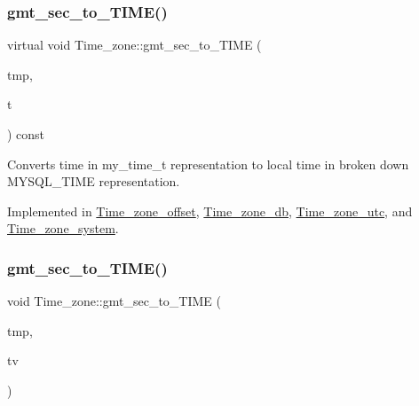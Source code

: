 \subsubsection{\texorpdfstring{gmt\+\_\+sec\+\_\+to\+\_\+\+T\+I\+M\+E()}{gmt\_sec\_to\_TIME()}\hspace{0.1cm}{\footnotesize\ttfamily [1/2]}}
{\footnotesize\ttfamily virtual void Time\+\_\+zone\+::gmt\+\_\+sec\+\_\+to\+\_\+\+T\+I\+ME (\begin{DoxyParamCaption}\item[{M\+Y\+S\+Q\+L\+\_\+\+T\+I\+ME $\ast$}]{tmp,  }\item[{my\+\_\+time\+\_\+t}]{t }\end{DoxyParamCaption}) const\hspace{0.3cm}{\ttfamily [pure virtual]}}

Converts time in my\+\_\+time\+\_\+t representation to local time in broken down M\+Y\+S\+Q\+L\+\_\+\+T\+I\+ME representation. 

Implemented in \mbox{\hyperlink{classTime__zone__offset_ad6f8ec41d8d908cdc49e699fa16deff2}{Time\+\_\+zone\+\_\+offset}}, \mbox{\hyperlink{classTime__zone__db_a25ecf69eb2b6802ecd8d7db2166bcecb}{Time\+\_\+zone\+\_\+db}}, \mbox{\hyperlink{classTime__zone__utc_a7232c037e186e31d60dc46fda88541a9}{Time\+\_\+zone\+\_\+utc}}, and \mbox{\hyperlink{classTime__zone__system_ad32a4573aac61a30383f49d69a93bf68}{Time\+\_\+zone\+\_\+system}}.

\mbox{\label{classTime__zone_ad85fc28fafc5f23927ba05e971bf0169}} 
\subsubsection{\texorpdfstring{gmt\+\_\+sec\+\_\+to\+\_\+\+T\+I\+M\+E()}{gmt\_sec\_to\_TIME()}\hspace{0.1cm}{\footnotesize\ttfamily [2/2]}}
{\footnotesize\ttfamily void Time\+\_\+zone\+::gmt\+\_\+sec\+\_\+to\+\_\+\+T\+I\+ME (\begin{DoxyParamCaption}\item[{M\+Y\+S\+Q\+L\+\_\+\+T\+I\+ME $\ast$}]{tmp,  }\item[{struct timeval}]{tv }\end{DoxyParamCaption})\hspace{0.3cm}{\ttfamily [inline]}}

